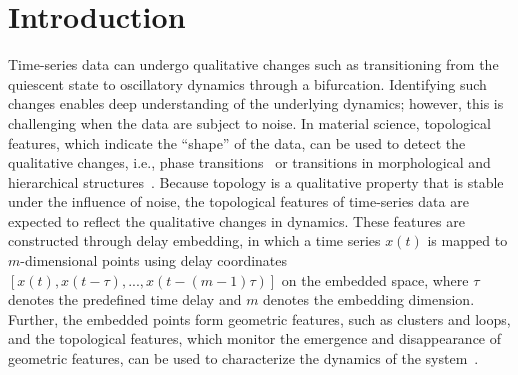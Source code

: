\documentclass[twocolumn,pre,amsmath,amssymb]{revtex4-1}
\begin{document}

\maketitle

\section{Introduction}
Time-series data can undergo qualitative changes such as transitioning 
from the quiescent state to oscillatory dynamics through a bifurcation. 
Identifying such changes enables deep understanding of the underlying dynamics; 
however, this is challenging when the data are subject to noise. 
In material science, topological features, which indicate the ``shape'' of the data,
can be used to detect the qualitative changes, i.e., phase transitions~\cite{pre:donato:phase:16,kusano:gskernel:2016} or transitions in morphological and hierarchical structures~\cite{pre:ardanza:granular:14,nakamura:nano:2015,hiraoka:pnas:2016,pre:ichinomiya:craze:17}.
Because topology is a qualitative property that is stable under the influence of noise,
the topological features of time-series data are expected to reflect the qualitative changes in dynamics. 
These features are constructed through delay embedding,
in which a time series $x(t)$ is mapped to $m$-dimensional points using 
delay coordinates $[x(t),x(t-\tau),...,x(t-(m-1)\tau)]$ on the embedded space,
where $\tau$ denotes the predefined time delay and $m$ denotes the embedding dimension.
Further, the embedded points form geometric features, such as clusters and loops,
and the topological features, which monitor the emergence and disappearance of geometric features, can be used to characterize the dynamics of the system~\cite{maletic:dynamic:2016,mittal:bifucation:2017}. 
\end{document}
